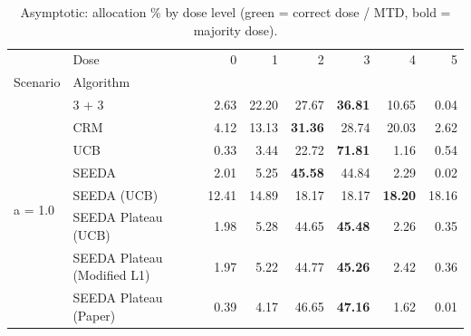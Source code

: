 \begin{table}[H]
\centering
\caption{Asymptotic: allocation \% by dose level (green = correct dose / MTD, bold = majority dose).}
\label{tab:asym_alloc_by_dose}
\begin{tabular}{llrrrrrr}
\toprule
 & Dose & 0 & 1 & 2 & 3 & 4 & 5 \\
Scenario & Algorithm &  &  &  &  &  &  \\
\midrule
\multirow[c]{8}{*}{a = 1.0} & 3 + 3 & 2.63 & 22.20 & {\cellcolor[HTML]{C8E6C9}} 27.67 & \bfseries 36.81 & 10.65 & 0.04 \\
 & CRM & 4.12 & 13.13 & {\cellcolor[HTML]{C8E6C9}} \bfseries 31.36 & 28.74 & 20.03 & 2.62 \\
 & UCB & 0.33 & 3.44 & {\cellcolor[HTML]{C8E6C9}} 22.72 & \bfseries 71.81 & 1.16 & 0.54 \\
 & SEEDA & 2.01 & 5.25 & {\cellcolor[HTML]{C8E6C9}} \bfseries 45.58 & 44.84 & 2.29 & 0.02 \\
 & SEEDA (UCB) & 12.41 & 14.89 & {\cellcolor[HTML]{C8E6C9}} 18.17 & 18.17 & \bfseries 18.20 & 18.16 \\
 & SEEDA Plateau (UCB) & 1.98 & 5.28 & {\cellcolor[HTML]{C8E6C9}} 44.65 & \bfseries 45.48 & 2.26 & 0.35 \\
 & SEEDA Plateau (Modified L1) & 1.97 & 5.22 & {\cellcolor[HTML]{C8E6C9}} 44.77 & \bfseries 45.26 & 2.42 & 0.36 \\
 & SEEDA Plateau (Paper) & 0.39 & 4.17 & {\cellcolor[HTML]{C8E6C9}} 46.65 & \bfseries 47.16 & 1.62 & 0.01 \\
\bottomrule
\end{tabular}
\end{table}
